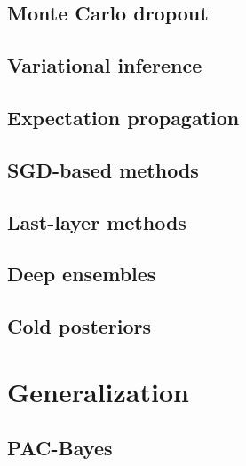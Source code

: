 \subsection{Monte Carlo dropout}


\subsection{Variational inference}


\subsection{Expectation propagation}


\subsection{SGD-based methods}


\subsection{Last-layer methods}


\subsection{Deep ensembles}


\subsection{Cold posteriors}

\section{Generalization}



\subsection{PAC-Bayes}
